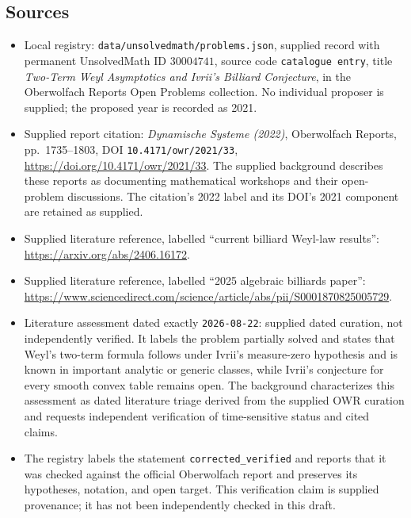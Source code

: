 \documentclass[11pt]{article}
\begin{document}
\subsection{Sources}
\begin{itemize}
\item Local registry: \texttt{data/unsolvedmath/problems.json}, supplied record with permanent UnsolvedMath ID \(30004741\), source code \texttt{catalogue entry}, title \emph{Two-Term Weyl Asymptotics and Ivrii's Billiard Conjecture}, in the Oberwolfach Reports Open Problems collection. No individual proposer is supplied; the proposed year is recorded as 2021.
\item Supplied report citation: \emph{Dynamische Systeme (2022)}, Oberwolfach Reports, pp.\ 1735--1803, DOI \texttt{10.4171/owr/2021/33}, \url{https://doi.org/10.4171/owr/2021/33}. The supplied background describes these reports as documenting mathematical workshops and their open-problem discussions. The citation's 2022 label and its DOI's 2021 component are retained as supplied.
\item Supplied literature reference, labelled ``current billiard Weyl-law results'': \url{https://arxiv.org/abs/2406.16172}.
\item Supplied literature reference, labelled ``2025 algebraic billiards paper'': \url{https://www.sciencedirect.com/science/article/abs/pii/S0001870825005729}.
\item Literature assessment dated exactly \texttt{2026-08-22}: supplied dated curation, not independently verified. It labels the problem partially solved and states that Weyl's two-term formula follows under Ivrii's measure-zero hypothesis and is known in important analytic or generic classes, while Ivrii's conjecture for every smooth convex table remains open. The background characterizes this assessment as dated literature triage derived from the supplied OWR curation and requests independent verification of time-sensitive status and cited claims.
\item The registry labels the statement \texttt{corrected\_verified} and reports that it was checked against the official Oberwolfach report and preserves its hypotheses, notation, and open target. This verification claim is supplied provenance; it has not been independently checked in this draft.
\end{itemize}
\end{document}
